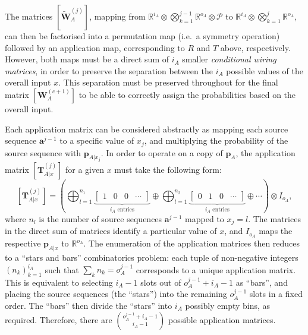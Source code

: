 \documentclass[10pt, a4paper]{article}
\numberwithin{equation}{section} %
\theoremstyle{definition}
\theoremstyle{plain}
\newcommand{\?}{\mathrel{?}} %
\newcommand{\R}{\mathbb{R}} %
\newcommand{\cvec}[1]{\boldsymbol{\mathbf{#1}}}    %
\newcommand{\matrp}[2]{\left[\mathbf{#1}#2\right]} %
\newcommand{\sP}{\mathcal{P}}
\begin{document}
      The matrices \(\matrp{\tilde{W}}{_A^{(j)}}\), mapping from \(\R^{i_A} \otimes \bigotimes_{k=1}^{j-1} \R^{o_A} \otimes \sP\) to \(\R^{i_A} \otimes \bigotimes_{k=1}^{j} \R^{o_A}\), can then be factorised into a permutation map (i.e.\ a symmetry operation) followed by an application map, corresponding to \(R\) and \(T\) above, respectively. However, both maps must be a direct sum of \(i_A\) smaller \emph{conditional wiring matrices}, in order to preserve the separation between the \(i_A\) possible values of the overall input \(x\). This separation must be preserved throughout for the final matrix \(\matrp{W}{_A^{(c+1)}}\) to be able to correctly assign the probabilities based on the overall input.

      Each application matrix can be considered abstractly as mapping each source sequence \(\cvec{a}^{j-1}\) to a specific value of \(x_j\), and multiplying the probability of the source sequence with \(\cvec{p}_{A|x_j}\). In order to operate on a copy of \(\cvec{p}_A\), the application matrix \(\matrp{T}{_{A|x}^{(j)}}\) for a given \(x\) must take the following form:
      \begin{equation}
        \matrp{T}{_{A|x}^{(j)}} = \left( \bigoplus_{l=1}^{n_1} \underbrace{\begin{bmatrix} 1 & 0 & 0 & \cdots \end{bmatrix}}_{i_A\text{ entries}}
          \oplus \bigoplus_{l=1}^{n_2} \underbrace{\begin{bmatrix} 0 & 1 & 0 & \cdots \end{bmatrix}}_{i_A\text{ entries}} \oplus \cdots
        \right) \otimes I_{o_A},
      \end{equation}
      where \(n_l\) is the number of source sequences \(\cvec{a}^{j-1}\) mapped to \(x_j = l\). The matrices in the direct sum of matrices identify a particular value of \(x\), and \(I_{o_A}\) maps the respective \(\cvec{p}_{A|x}\) to \(\R^{o_A}\). The enumeration of the application matrices then reduces to a ``stars and bars'' combinatorics problem: each tuple of non-negative integers \({(n_k)}_{k=1}^{i_A}\) such that \( \sum_{k} n_k = o_A^{j-1} \) corresponds to a unique application matrix. This is equivalent to selecting \(i_A-1\) slots out of \(o_A^{j-1}+i_A-1\) as ``bars'', and placing the source sequences (the ``stars'') into the remaining \(o_A^{j-1}\) slots in a fixed order. The ``bars'' then divide the ``stars'' into \(i_A\) possibly empty bins, as required. Therefore, there are \(\binom{o_A^{j-1} + i_A-1}{i_A-1}\) possible application matrices.
\end{document}
